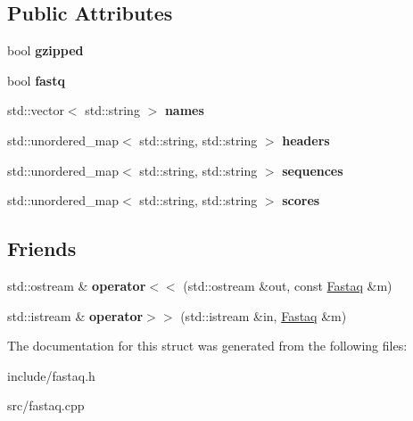 \subsection*{Public Attributes}
\begin{DoxyCompactItemize}
\item 
\mbox{\label{structFastaq_a41d1b440eb1cb89a1bc9721f497dcb78}} 
bool {\bfseries gzipped}
\item 
\mbox{\label{structFastaq_a44430f2d830b35d1edd83b409208bccf}} 
bool {\bfseries fastq}
\item 
\mbox{\label{structFastaq_adf4bbf9aabe5dff1e5ed9b8bd717faf2}} 
std\+::vector$<$ std\+::string $>$ {\bfseries names}
\item 
\mbox{\label{structFastaq_a52402e57271fbb1ee7f1ea6c30fb6a31}} 
std\+::unordered\+\_\+map$<$ std\+::string, std\+::string $>$ {\bfseries headers}
\item 
\mbox{\label{structFastaq_a83d3a7fb517a3a76470ed8eaf59e9f80}} 
std\+::unordered\+\_\+map$<$ std\+::string, std\+::string $>$ {\bfseries sequences}
\item 
\mbox{\label{structFastaq_a71a65b12d640fd48600852110d8fe196}} 
std\+::unordered\+\_\+map$<$ std\+::string, std\+::string $>$ {\bfseries scores}
\end{DoxyCompactItemize}
\subsection*{Friends}
\begin{DoxyCompactItemize}
\item 
\mbox{\label{structFastaq_a2f9246ec341d86d3a27dde5f5aa885a1}} 
std\+::ostream \& {\bfseries operator$<$$<$} (std\+::ostream \&out, const \hyperlink{structFastaq}{Fastaq} \&m)
\item 
\mbox{\label{structFastaq_a37c71a2ddfbe122539a741241ec3a2b9}} 
std\+::istream \& {\bfseries operator$>$$>$} (std\+::istream \&in, \hyperlink{structFastaq}{Fastaq} \&m)
\end{DoxyCompactItemize}


The documentation for this struct was generated from the following files\+:\begin{DoxyCompactItemize}
\item 
include/fastaq.\+h\item 
src/fastaq.\+cpp\end{DoxyCompactItemize}

